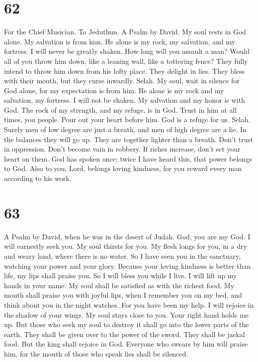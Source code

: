 \hypertarget{section-61}{%
\section{62}\label{section-61}}

For the Chief Musician. To Jeduthun. A Psalm by David.  My
soul rests in God alone. My salvation is from him.  He
alone is my rock, my salvation, and my fortress. I will never be greatly
shaken.  How long will you assault a man? Would all of you
throw him down, like a leaning wall, like a tottering fence?
 They fully intend to throw him down from his lofty place.
They delight in lies. They bless with their mouth, but they curse
inwardly. Selah.  My soul, wait in silence for God alone,
for my expectation is from him.  He alone is my rock and
my salvation, my fortress. I will not be shaken.  My
salvation and my honor is with God. The rock of my strength, and my
refuge, is in God.  Trust in him at all times, you people.
Pour out your heart before him. God is a refuge for us. Selah.
 Surely men of low degree are just a breath, and men of
high degree are a lie. In the balances they will go up. They are
together lighter than a breath.  Don't trust in
oppression. Don't become vain in robbery. If riches increase, don't set
your heart on them.  God has spoken once; twice I have
heard this, that power belongs to God.  Also to you,
Lord, belongs loving kindness, for you reward every man according to his
work.

\hypertarget{section-62}{%
\section{63}\label{section-62}}

A Psalm by David, when he was in the desert of Judah. 
God, you are my God. I will earnestly seek you. My soul thirsts for you.
My flesh longs for you, in a dry and weary land, where there is no
water.  So I have seen you in the sanctuary, watching your
power and your glory.  Because your loving kindness is
better than life, my lips shall praise you.  So I will
bless you while I live. I will lift up my hands in your name.
 My soul shall be satisfied as with the richest food. My
mouth shall praise you with joyful lips,  when I remember
you on my bed, and think about you in the night watches. 
For you have been my help. I will rejoice in the shadow of your wings.
 My soul stays close to you. Your right hand holds me up.
 But those who seek my soul to destroy it shall go into
the lower parts of the earth.  They shall be given over
to the power of the sword. They shall be jackal food. 
But the king shall rejoice in God. Everyone who swears by him will
praise him, for the mouth of those who speak lies shall be silenced.

